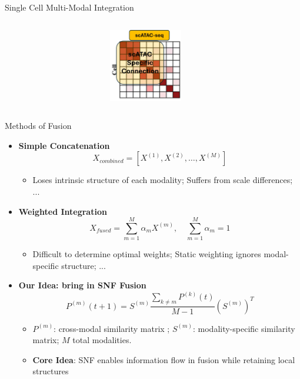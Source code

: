 \documentclass{beamer}
\begin{document}
\begin{frame}{Single Cell Multi-Modal Integration}
\begin{columns}[T]
\begin{column}{0.3\textwidth}
\vspace{0.1cm}

\includegraphics[width=0.95\textwidth,height=3.2cm,keepaspectratio]{./sxSNF_figure/Fig1b.jpg}
\end{column}
\end{columns}

\end{frame}






\begin{frame}{Methods of Fusion}
\begin{itemize}
\item \textbf{Simple Concatenation}
\[
X_{combined} = [X^{(1)}, X^{(2)}, \ldots, X^{(M)}]
\]
\vspace{-2ex}
  \begin{itemize}
  \item \scriptsize Loses intrinsic structure of each modality; Suffers from scale differences; ...
  \end{itemize}

\item \textbf{Weighted Integration}
\[
X_{fused} = \sum_{m=1}^{M} \alpha_m X^{(m)}, \quad \sum_{m=1}^{M} \alpha_m = 1
\]
\vspace{-2ex}
  \begin{itemize}
  \item \scriptsize Difficult to determine optimal weights; Static weighting ignores modal-specific structure; ...
  \end{itemize}

\item \textcolor{sintefyellow}{\textbf{Our Idea: bring in SNF Fusion}}
\[
P^{(m)}(t+1)= S^{(m)} \frac{\sum_{k \neq m} P^{(k)}(t)}{M-1} (S^{(m)})^T
\]
\vspace{-2ex}
  \begin{itemize}
  \item \scriptsize $P^{(m)}$: cross-modal similarity matrix ; $S^{(m)}$: modality-specific similarity matrix; $M$ total modalities.
  \item \scriptsize \textbf{Core Idea}: SNF enables information flow in fusion while retaining local structures
  \end{itemize}
\end{itemize}
\end{frame}
\end{document}
